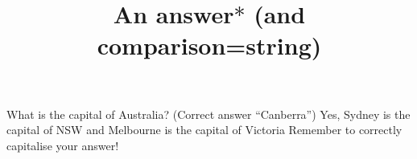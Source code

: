 \documentclass[hidesidemenu]{webquiz}
\title{An answer$*$ (and comparison=string)}
\begin{document}
  \begin{question}     %
     What is the capital of Australia?
      (Correct answer ``Canberra'')
     \whenRight  Yes, Sydney is the capital of NSW and Melbourne is the
     capital of Victoria
     \whenWrong Remember to correctly capitalise your answer!
  \end{question}
\end{document}

